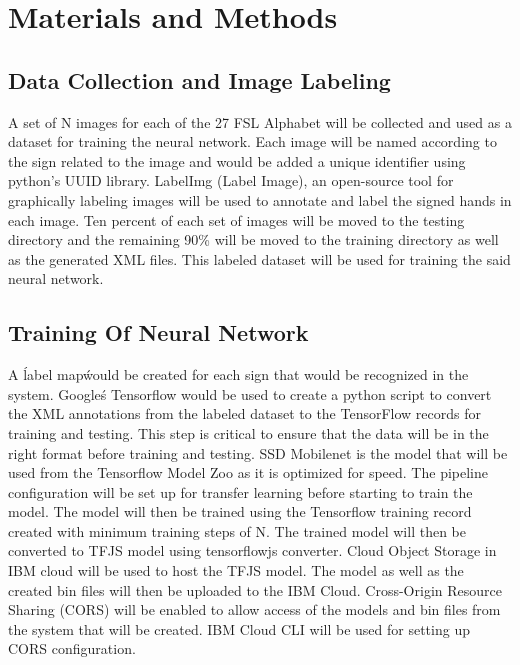 \documentclass[journal]{./IEEE/IEEEtran}
\begin{document}
\section{Materials and Methods}
\subsection{Data Collection and Image Labeling}
\par
A set of N images for each of the 27 FSL Alphabet  will be collected and used as a dataset for training the neural network. Each image will be named according to the sign related to the image and would be added a unique identifier using python’s UUID library. LabelImg (Label Image), an open-source tool for graphically labeling images will be used to annotate and label the signed hands in each image. Ten percent of each set of images will be moved to the testing directory and the remaining 90\% will be moved to the training directory as well as the generated XML files. This labeled dataset will be used for training the said neural network.

\subsection{Training Of Neural Network}
\par
A \'label map\' would be created for each sign that would be recognized in the system. Google\'s Tensorflow would be used to create a python script to convert the XML annotations from the labeled dataset to the TensorFlow records for training and testing. This step is critical to ensure that the data will be in the right format before training and testing. SSD Mobilenet is the model that will be used from the Tensorflow Model Zoo as it is optimized for speed. The pipeline configuration will be set up for transfer learning before starting to train the model. The model will then be trained using the Tensorflow training record created with minimum training steps of N.
The trained model will then be converted to TFJS model using tensorflowjs converter.  Cloud Object Storage in IBM cloud will be used to host the TFJS model. The model as well as the created bin files will then be uploaded to the IBM Cloud. Cross-Origin Resource Sharing (CORS) will be enabled to allow access of the models and bin files from the system that will be created. IBM Cloud CLI will be used for setting up CORS configuration. 
\end{document}
